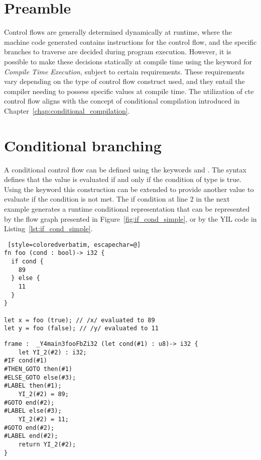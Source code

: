 \section{Preamble}

Control flows are generally determined dynamically at runtime, where the machine
code generated contains instructions for the control flow, and the specific
branches to traverse are decided during program execution. However, it is
possible to make these decisions statically at compile time using the keyword
 for \textit{Compile Time Execution}, subject to certain
requirements. These requirements vary depending on the type of control flow
construct used, and they entail the compiler needing to possess specific values
at compile time. The utilization of cte control flow aligns with the concept of
conditional compilation introduced in
Chapter~\ref{chap:conditional_compilation}.

\section{Conditional branching}%
\label{sec:if_else}

A conditional control flow can be defined using the keywords  and
. The syntax  defines that the value  is
evaluated if and only if the condition  of type  is true.
Using the keyword  this construction can be extended to provide
another value to evaluate if the condition is not met. The if condition at line
2 in the next example generates a runtime conditional representation that can be
represented by the flow graph presented in Figure~\ref{fig:if_cond_simple}, or
by the YIL code in Listing~\ref{lst:if_cond_simple}.

\begin{lstlisting} [style=coloredverbatim, escapechar=@]
fn foo (cond : bool)-> i32 {
  if cond {
    89
  } else {
    11
  }
}

let x = foo (true); // /x/ evaluated to 89
let y = foo (false); // /y/ evaluated to 11
\end{lstlisting}

\begin{lstlisting}[style=lyilVerb, caption=Simple condition, label=lst:if_cond_simple]
frame :  _Y4main3fooFbZi32 (let cond(#1) : u8)-> i32 {
    let YI_2(#2) : i32;
#IF cond(#1)
#THEN_GOTO then(#1)
#ELSE_GOTO else(#3);
#LABEL then(#1);
    YI_2(#2) = 89;
#GOTO end(#2);
#LABEL else(#3);
    YI_2(#2) = 11;
#GOTO end(#2);
#LABEL end(#2);
    return YI_2(#2);
}
\end{lstlisting}

